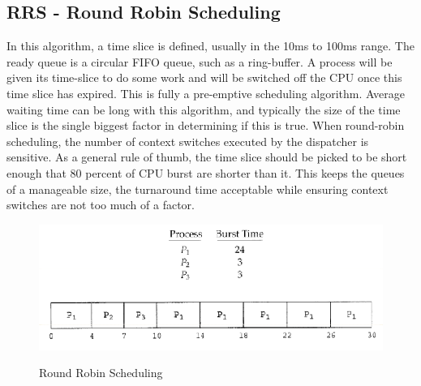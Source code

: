 \documentclass[10pt,a4paper]{article}
\begin{document}
\subsection{RRS - Round Robin Scheduling}
In this algorithm, a time slice is defined, usually in the 10ms to 100ms range. The ready queue is a circular FIFO queue, such as a ring-buffer. A process will be given its time-slice to do some work and will be switched off the CPU once this time slice has expired. This is fully a pre-emptive scheduling algorithm. Average waiting time can be long with this algorithm, and typically the size of the time slice is the single biggest factor in determining if this is true. When round-robin scheduling, the number of context switches executed by the dispatcher is sensitive. As a general rule of thumb, the time slice should be picked to be short enough that 80 percent of CPU burst are shorter than it. This keeps the queues of a manageable size, the turnaround time acceptable while ensuring context switches are not too much of a factor. 
\begin{figure}
\caption{Round Robin Scheduling \cite{OSCONCEPTS}}
\begin{center}
\includegraphics[scale=0.45]{../images/rr-sched.png}
\label{fcfs}
\end{center}
\end{figure}
\end{document}
